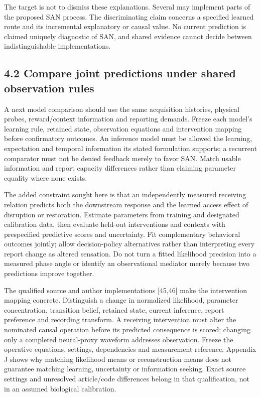 \documentclass[
  american,
  11pt,
  letterpaper,
]{article}
\newcounter{none} %
\begin{document}
The target is not to dismiss these explanations. Several may implement parts of the proposed SAN process. The discriminating claim concerns a specified learned route and its incremental explanatory or causal value. No current prediction is claimed uniquely diagnostic of SAN, and shared evidence cannot decide between indistinguishable implementations.

\subsection{4.2 Compare joint predictions under shared observation rules}\label{compare-joint-predictions-under-shared-observation-rules}

A next model comparison should use the same acquisition histories, physical probes, reward/context information and reporting demands. Freeze each model's learning rule, retained state, observation equations and intervention mapping before confirmatory outcomes. An inference model must be allowed the learning, expectation and temporal information its stated formulation supports; a recurrent comparator must not be denied feedback merely to favor SAN. Match usable information and report capacity differences rather than claiming parameter equality where none exists.

The added constraint sought here is that an independently measured receiving relation predicts both the downstream response and the learned access effect of disruption or restoration. Estimate parameters from training and designated calibration data, then evaluate held-out interventions and contexts with prespecified predictive scores and uncertainty. Fit complementary behavioral outcomes jointly; allow decision-policy alternatives rather than interpreting every report change as altered sensation. Do not turn a fitted likelihood precision into a measured phase angle or identify an observational mediator merely because two predictions improve together.

The qualified source and author implementations {[}45,46{]} make the intervention mapping concrete. Distinguish a change in normalized likelihood, parameter concentration, transition belief, retained state, current inference, report preference and recording transform. A receiving intervention must alter the nominated causal operation before its predicted consequence is scored; changing only a completed neural-proxy waveform addresses observation. Freeze the operative equations, settings, dependencies and measurement reference. Appendix J shows why matching likelihood means or reconstruction means does not guarantee matching learning, uncertainty or information seeking. Exact source settings and unresolved article/code differences belong in that qualification, not in an assumed biological calibration.
\end{document}
